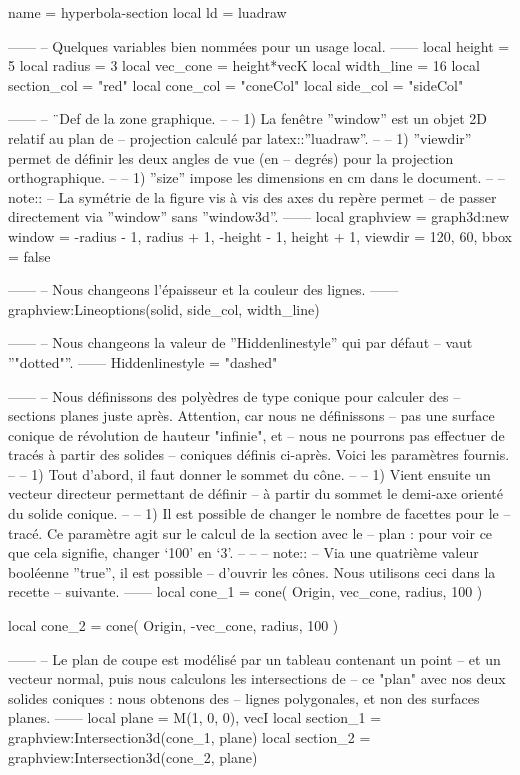 \documentclass{standalone}
\begin{document}
\begin{luadraw*}{name = hyperbola-section}
local ld = luadraw

------
-- Quelques variables bien nommées pour un usage local.
------
local height      =  5
local radius      =  3
local vec_cone    = height*vecK
local width_line  =  16
local section_col = "red"
local cone_col    = "coneCol"
local side_col    = "sideCol"

------
-- ¨Def de la zone graphique.
--
--     1) La fenêtre ''window'' est un objet 2D relatif au plan de
--     projection calculé par latex::''luadraw''.
--
--     1) ''viewdir'' permet de définir les deux angles de vue (en
--     degrés) pour la projection orthographique.
--
--     1) ''size'' impose les dimensions en cm dans le document.
--
-- note::
--     La symétrie de la figure vis à vis des axes du repère permet
--     de passer directement via ''window'' sans ''window3d''.
------
local graphview = graph3d:new{
  window  = {-radius - 1, radius + 1, -height - 1, height + 1},
  viewdir = {120, 60},
  bbox    = false
}

------
-- Nous changeons l'épaisseur et la couleur des lignes.
------
graphview:Lineoptions(solid, side_col, width_line)

------
-- Nous changeons la valeur de ''Hiddenlinestyle'' qui par défaut
-- vaut ''"dotted"''.
------
Hiddenlinestyle = "dashed"

------
-- Nous définissons des polyèdres de type conique pour calculer des
-- sections planes juste après. Attention, car nous ne définissons
-- pas une surface conique de révolution de hauteur "infinie", et
-- nous ne pourrons pas effectuer de tracés à partir des solides
-- coniques définis ci-après. Voici les paramètres fournis.
--
--     1) Tout d'abord, il faut donner le sommet du cône.
--
--     1) Vient ensuite un vecteur directeur permettant de définir
--     à partir du sommet le demi-axe orienté du solide conique.
--
--     1) Il est possible de changer le nombre de facettes pour le
--     tracé. Ce paramètre agit sur le calcul de la section avec le
--     plan : pour voir ce que cela signifie, changer `100' en `3'.
--
--
-- note::
--     Via une quatrième valeur booléenne ''true'', il est possible
--     d'ouvrir les cônes. Nous utilisons ceci dans la recette
--     suivante.
------
local cone_1 = cone(
  Origin, vec_cone, radius,
  100
)

local cone_2 = cone(
  Origin,  -vec_cone, radius,
  100
)

------
-- Le plan de coupe est modélisé par un tableau contenant un point
-- et un vecteur normal, puis nous calculons les intersections de
-- ce "plan" avec nos deux solides coniques : nous obtenons des
-- lignes polygonales, et non des surfaces planes.
------
local plane     = {M(1, 0, 0), vecI}
local section_1 = graphview:Intersection3d(cone_1, plane)
local section_2 = graphview:Intersection3d(cone_2, plane)


\end{luadraw*}
\end{document}
